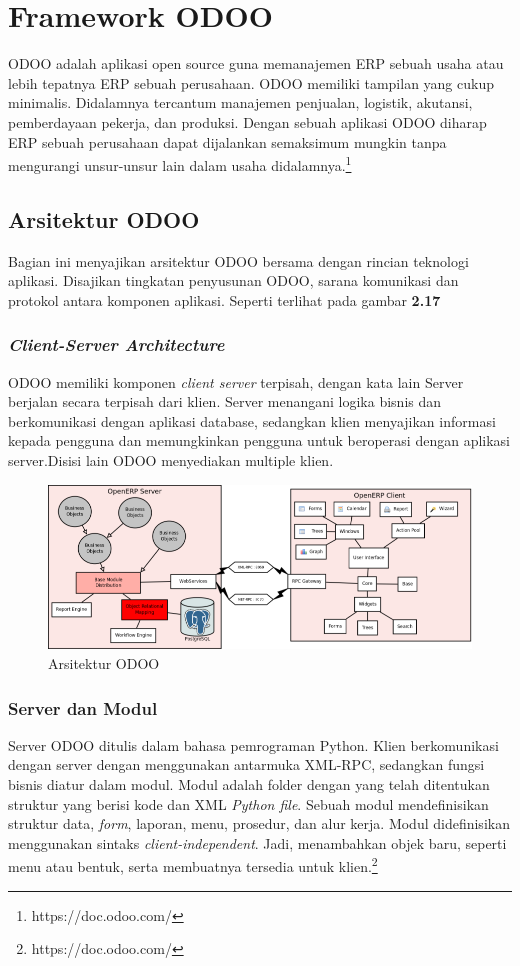 	
	\section{Framework ODOO} 
	
	ODOO adalah aplikasi open source guna memanajemen ERP sebuah usaha atau lebih tepatnya ERP sebuah perusahaan. ODOO memiliki tampilan yang cukup minimalis. Didalamnya tercantum manajemen penjualan, logistik, akutansi, pemberdayaan pekerja, dan produksi. Dengan sebuah aplikasi ODOO diharap ERP sebuah perusahaan dapat dijalankan semaksimum mungkin tanpa mengurangi unsur-unsur lain dalam usaha didalamnya.\footnote{https://doc.odoo.com/}

\subsection{Arsitektur ODOO}

Bagian ini menyajikan arsitektur ODOO bersama dengan rincian teknologi aplikasi. Disajikan tingkatan penyusunan ODOO, sarana komunikasi dan protokol antara komponen aplikasi. Seperti terlihat pada gambar \textbf{2.17}

\subsubsection{\textit{Client-Server Architecture}}
ODOO memiliki komponen \textit{client server} terpisah, dengan kata lain
Server berjalan secara terpisah dari klien. Server menangani logika bisnis dan berkomunikasi dengan aplikasi database, sedangkan
klien menyajikan informasi kepada pengguna dan memungkinkan pengguna untuk beroperasi dengan aplikasi server.Disisi lain ODOO menyediakan multiple klien.

	\begin{figure}[H]
	\centering
	\includegraphics[scale=0.4]{Gambar/arsitekturODOO2}
	\caption{Arsitektur ODOO }
	\end{figure}


\subsubsection{Server dan Modul}
Server ODOO ditulis dalam bahasa pemrograman Python. Klien berkomunikasi dengan server dengan menggunakan antarmuka XML-RPC, sedangkan fungsi bisnis  diatur dalam modul. Modul adalah folder dengan yang telah ditentukan struktur yang berisi kode dan XML \textit{Python file}. Sebuah modul mendefinisikan struktur data, \textit{form}, laporan, menu, prosedur, dan alur kerja. Modul didefinisikan menggunakan sintaks \textit{client-independent}. Jadi, menambahkan objek baru, seperti menu atau bentuk, serta membuatnya tersedia untuk klien.\footnote{https://doc.odoo.com/}

